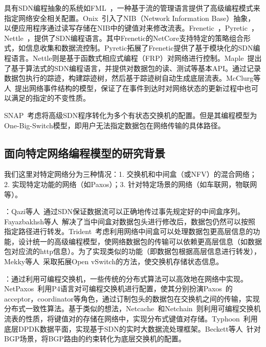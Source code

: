 具有SDN编程抽象的系统如FML~\cite{hinrichs2009practical}，一种基于流的管理语言提供了高级编程模式来指定网络安全相关配置。Onix~\cite{koponen2010onix}引入了NIB（Network Information Base）抽象，以便应用程序通过读写存储在NIB中的键值对来修改流表。Frenetic~\cite{foster2011frenetic}，Pyretic~\cite{reich2013modular}，Nettle~\cite{voellmy2011nettle}，提供了SDN编程语言。其中Frenetic的NetCore支持特定的策略组合形式，如信息收集和数据流控制。Pyretic拓展了Frenetic提供了基于模块化的SDN编程语言。Nettle则是基于函数式相应式编程（FRP）对网络进行控制。Maple~\cite{maple}提出了基于算法式的SDN编程语言，并提供对数据包的读、测试等基本API。通过记录数据包执行的踪迹，构建踪迹树，然后基于踪迹树自动生成底层流表。McClurg等人~\cite{mcclurg2016event}提出网络事件结构的模型，保证了在事件到达时对网络状态的更新过程中也可以满足的指定的不变性质。

SNAP~\cite{snap}考虑将高级SDN程序转化为多个有状态交换机的配置。但是其编程模型为One-Big-Switch模型，即用户无法指定数据包在网络传输的具体路径。


\subsection{面向特定网络编程模型的研究背景}

我们这里对特定网络分为三种情况：1. 交换机和中间盒（或NFV）的混合网络；2. 实现特定功能的网络（如Paxos）；3. 针对特定场景的网络（如车联网，物联网等）。

：Qazi等人~\cite{qazi2013simple}通过SDN保证数据流可以正确地传过事先规定好的中间盒序列。Fayazbakhsh等人~\cite{fayazbakhsh2014enforcing}解决了当中间盒对数据包头进行修改后，数据包仍然可以按照指定路径进行转发。Trident~\cite{gao2018t}考虑利用网络中间盒可以处理数据包更高层信息的功能，设计统一的高级编程模型，使网络数据包的传输可以依赖更高层信息（如数据包对应流的http信息）。为了实现类似的功能（即数据包根据高层信息进行转发），Mekky等人~\cite{mekky2014application}采取拓展Open vSwitch的方法，使交换机存储状态信息。

：通过利用可编程交换机，一些传统的分布式算法可以高效地在网络中实现。NetPaxos~\cite{dang2015netpaxos,dang2016paxos}利用P4语言对可编程交换机进行配置，使其分别扮演Paxos~\cite{lamport2001paxos}的acceptor，coordinator等角色，通过订制包头的数据包在交换机之间的传输，实现分布式一致性算法。基于类似的想法，Netcache~\cite{jin2017netcache}和Netchain~\cite{jin2018netchain}则利用可编程交换机流表的性质，将键值对的存储在网络中，实现分布式键值对存储。Typhoon~\cite{cho2017typhoon}利用底层DPDK数据平面，实现基于SDN的实时大数据流处理框架。Beckett等人~\cite{beckett2016don}针对BGP场景，将BGP路由的约束转化为底层交换机的配置。

